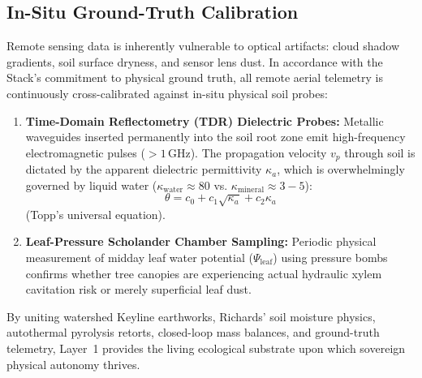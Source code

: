 \subsection{In-Situ Ground-Truth Calibration}
Remote sensing data is inherently vulnerable to optical artifacts: cloud shadow gradients, soil surface dryness, and sensor lens dust. In accordance with the Stack's commitment to physical ground truth, all remote aerial telemetry is continuously cross-calibrated against in-situ physical soil probes:
\begin{enumerate}
    \item \textbf{Time-Domain Reflectometry (TDR) Dielectric Probes:} Metallic waveguides inserted permanently into the soil root zone emit high-frequency electromagnetic pulses ($>1\,\mathrm{GHz}$). The propagation velocity $v_p$ through soil is dictated by the apparent dielectric permittivity $\kappa_a$, which is overwhelmingly governed by liquid water ($\kappa_{\mathrm{water}} \approx 80$ vs. $\kappa_{\mathrm{mineral}} \approx 3 - 5$):
    \begin{equation}
    \theta = c_0 + c_1 \sqrt{\kappa_a} + c_2 \kappa_a
    \label{eq:topp_tdr}
    \end{equation}
    (Topp's universal equation).
    \item \textbf{Leaf-Pressure Scholander Chamber Sampling:} Periodic physical measurement of midday leaf water potential ($\Psi_{\mathrm{leaf}}$) using pressure bombs confirms whether tree canopies are experiencing actual hydraulic xylem cavitation risk or merely superficial leaf dust.
\end{enumerate}

By uniting watershed Keyline earthworks, Richards' soil moisture physics, autothermal pyrolysis retorts, closed-loop mass balances, and ground-truth telemetry, Layer~1 provides the living ecological substrate upon which sovereign physical autonomy thrives.
